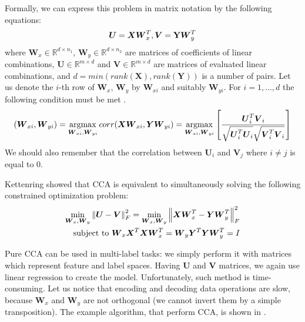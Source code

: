 \documentclass[english,a4paper,twoside]{ppfcmthesis}
\begin{document}
Formally, we can express this problem in matrix notation by the following equations:
\begin{equation}\label{eq:cca1}
    \boldsymbol{U}=\boldsymbol{X}\boldsymbol{W}_x^T,   \boldsymbol{V}=\bold{Y}\boldsymbol{W}_y^T    
\end{equation}
where $\boldsymbol{W}_x \in \mathbb{R}^{d \times n_1}$, $\boldsymbol{W}_y \in \mathbb{R}^{d \times n_2}$ are matrices of coefficients of linear combinations, $\boldsymbol{U} \in \mathbb{R}^{m \times d}$ and $\boldsymbol{V} \in \mathbb{R}^{m \times d}$ are matrices of evaluated linear combinations, and $d=min(rank(\boldsymbol{X}), rank(\boldsymbol{Y}))$ is a number of pairs. Let us denote the $i$-th row of $\boldsymbol{W}_x$, $\boldsymbol{W}_y$ by $\boldsymbol{W}_{xi}$ and suitably $\boldsymbol{W}_{yi}$. For $i=1,\ldots,d$ the following condition must be met \citep{William}.
\begin{equation}\label{eq:cca2}
    (\boldsymbol{W}_{xi}, \boldsymbol{W}_{yi})=\operatorname*{argmax}_{\boldsymbol{W}_{xi}, \boldsymbol{W}_{yi}} corr(\boldsymbol{X}\boldsymbol{W}_{xi}, \boldsymbol{Y}\boldsymbol{W}_{yi}) = \operatorname*{argmax}_{\boldsymbol{W}_{xi}, \boldsymbol{W}_{yi}} \left[\frac{\boldsymbol{U}^{T}_i\boldsymbol{V}_i}{\sqrt{\boldsymbol{U}^T_i\boldsymbol{U}_i}\sqrt{\boldsymbol{V}^{T}_i\boldsymbol{V}_i}}\right] 
\end{equation}
We should also remember that the correlation between $\boldsymbol{U}_i$ and $\boldsymbol{V}_j$ where $i\neq j$ is equal to $0$.

Kettenring \citep{Kettenring} showed that CCA is equivalent to simultaneously solving the following constrained optimization problem:
\begin{equation}\label{eq:cca3}
\begin{split}
    \min_{\boldsymbol{W}_x, \boldsymbol{W}_y} \left\lVert\boldsymbol{U}-\boldsymbol{V}\right\rVert_{F}^2 = \min_{\boldsymbol{W}_x, \boldsymbol{W}_y} \left\lVert\boldsymbol{X}\boldsymbol{W}_x^T-\boldsymbol{Y}\boldsymbol{W}_y^T\right\rVert_{F}^2 \\ 
    \text{   subject to   } \boldsymbol{W}_x\boldsymbol{X}^T\boldsymbol{X}\boldsymbol{W}_x^T=\boldsymbol{W}_y\boldsymbol{Y}^T\boldsymbol{Y}\boldsymbol{W}_y^T=I   
\end{split}
\end{equation}

Pure CCA can be used in multi-label tasks: we simply perform it with matrices which represent feature and label spaces. Having $\boldsymbol{U}$ and $\boldsymbol{V}$ matrices, we again use linear regression to create the model. Unfortunately, such method is time-consuming. Let us notice that encoding and decoding data operations are slow, because $\boldsymbol{W}_x$ and $\boldsymbol{W}_y$ are not orthogonal (we cannot invert them by a simple transposition). The example algorithm, that perform CCA, is shown in . 
\end{document}
